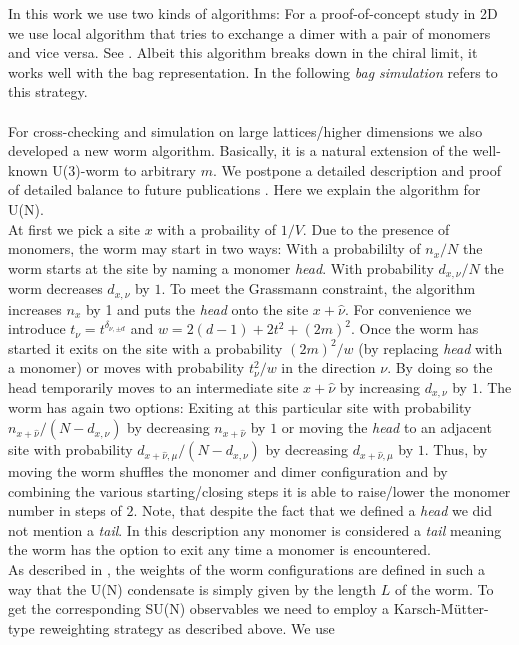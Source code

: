 \documentclass{PoS}
\begin{document}
In this work we use two kinds of algorithms: For a proof-of-concept study in 2D we use local algorithm that tries to exchange a dimer with a pair of monomers and vice versa. See \cite{Karsch:1988zx}. Albeit this algorithm breaks down in the chiral limit, it works well with the bag representation. In the following \textit{bag simulation} refers to this strategy.\\
\\For cross-checking and simulation on large lattices/higher dimensions we also developed a new worm algorithm. Basically, it is a natural extension of the well-known U(3)-worm \cite{Adams:2003cca} to arbitrary $m$. We postpone a detailed description and proof of detailed balance to future publications \cite{Orasch:2019_1, Orasch:2019_2}. Here we explain the algorithm for U(N).\\
At first we pick a site $x$ with a probaility of $1/V$. Due to the presence of monomers, the worm may start in two ways: With a probabililty of $n_x/N$ the worm starts at the site by naming a monomer \textit{head}. With probability $d_{x,\nu}/N$ the worm decreases $d_{x,\nu}$ by $1$. To meet the Grassmann constraint, the algorithm increases $n_x$ by 1 and puts the \textit{head} onto the site $x+\hat{\nu}$. For convenience we introduce $t_{\nu} = t^{\delta_{\nu,\pm d}}$ and $w = 2(d-1) + 2t^2 + (2m)^2$. Once the worm has started it exits on the site with a probability $(2m)^2/w$ (by replacing \textit{head} with a monomer) or moves with probability $t^2_{\nu}/w$ in the direction $\nu$. By doing so the head temporarily moves to an intermediate site $x+\hat{\nu}$ by increasing $d_{x,\nu}$ by $1$. The worm has again two options: Exiting at this particular site with probability $n_{x+\hat{\nu}}/(N-d_{x,\nu})$ by decreasing $n_{x+\hat{\nu}}$ by $1$ or moving the \textit{head} to an adjacent site with probability $d_{x+\hat{\nu}, \mu}/(N-d_{x,\nu})$ by decreasing $d_{x+\hat{\nu}, \mu}$ by $1$. Thus, by moving the worm shuffles the monomer and dimer configuration and by combining the various starting/closing steps it is able to raise/lower the monomer number in steps of $2$. Note, that despite the fact that we defined a \textit{head} we did not mention a \textit{tail}. In this description any monomer is considered a \textit{tail} meaning the worm has the option to exit any time a monomer is encountered.\\
As described in \cite{Adams:2003cca}, the weights of the worm configurations are defined in such a way that the U(N) condensate is simply given by the length $L$ of the worm. To get the corresponding SU(N) observables we need to employ a Karsch-M\"utter-type reweighting strategy as described above. We use \cite{Boyd:1991fb}
\end{document}
